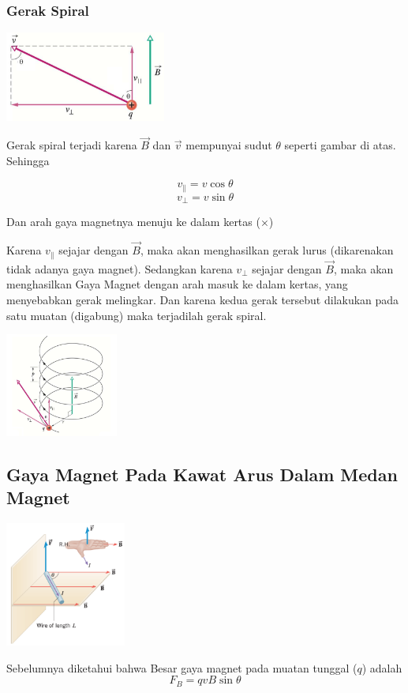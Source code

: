 \documentclass[twocolumn, 11pt]{article}%
\begin{document}
\subsubsection{Gerak Spiral}%
\begin{center}
    \includegraphics[width=200px]{10.png}
\end{center}

Gerak spiral terjadi karena $\vec B$ dan $\vec v$ mempunyai sudut 
$\theta$ seperti gambar di atas. Sehingga

\[v_{\parallel} =v\cos\theta \]
\[v_{\perp} =v\sin\theta \]

Dan arah gaya magnetnya menuju ke dalam kertas ($\times$)

Karena $v_{\parallel}$ sejajar dengan $\vec B$, maka akan menghasilkan
gerak lurus (dikarenakan tidak adanya gaya magnet). Sedangkan karena
$v_{\perp}$ sejajar dengan $\vec B$, maka akan menghasilkan Gaya Magnet
dengan arah masuk ke dalam kertas, yang menyebabkan gerak melingkar. Dan
karena kedua gerak tersebut dilakukan pada satu muatan (digabung) maka
terjadilah gerak spiral.

\begin{center}
    \includegraphics[width=140px]{11.png}
\end{center}

\subsection{Gaya Magnet Pada Kawat Arus Dalam Medan Magnet}%
\begin{center}
    \includegraphics[width=150px]{12.png}
\end{center}
Sebelumnya diketahui bahwa Besar gaya magnet pada muatan tunggal ($q$)
adalah
\[ F_B = qvB\sin\theta \]
\end{document}
